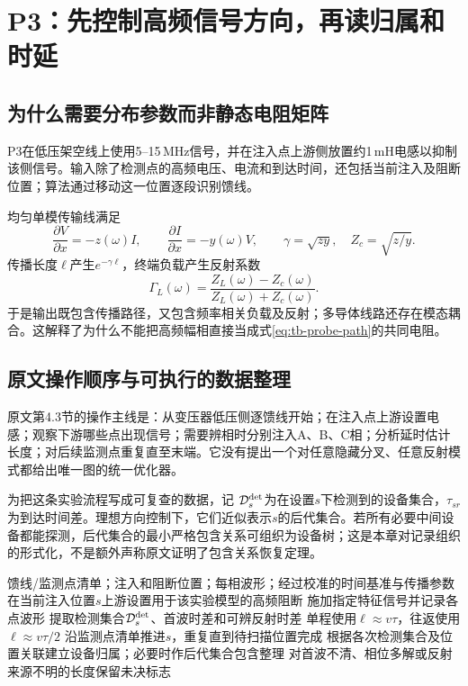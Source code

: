 \documentclass[UTF8,11pt,fontset=fandol,openany,oneside]{ctexbook}
\theoremstyle{definition}
\theoremstyle{remark}
\numberwithin{equation}{chapter}
\begin{document}
\section{P3：先控制高频信号方向，再读归属和时延}
\label{sec:tb-P3}

\subsection{为什么需要分布参数而非静态电阻矩阵}

P3\citep{P3}在低压架空线上使用5--15\,MHz信号，并在注入点上游侧放置约1\,mH电感以抑制该侧信号。输入除了检测点的高频电压、电流和到达时间，还包括当前注入及阻断位置；算法通过移动这一位置逐段识别馈线。

均匀单模传输线满足
\[
 \frac{\partial V}{\partial x}=-z(\omega)I,\qquad
 \frac{\partial I}{\partial x}=-y(\omega)V,\qquad
 \gamma=\sqrt{zy},\quad Z_c=\sqrt{z/y}.
\]
传播长度$\ell$产生$e^{-\gamma\ell}$，终端负载产生反射系数
\begin{equation}
 \Gamma_L(\omega)=\frac{Z_L(\omega)-Z_c(\omega)}
                       {Z_L(\omega)+Z_c(\omega)}.
 \label{eq:tb-P3-reflect}
\end{equation}
于是输出既包含传播路径，又包含频率相关负载及反射；多导体线路还存在模态耦合。这解释了为什么不能把高频幅相直接当成式\eqref{eq:tb-probe-path}的共同电阻。

\subsection{原文操作顺序与可执行的数据整理}

原文第4.3节的操作主线是：从变压器低压侧逐馈线开始；在注入点上游设置电感；观察下游哪些点出现信号；需要辨相时分别注入A、B、C相；分析延时估计长度；对后续监测点重复直至末端。它没有提出一个对任意隐藏分叉、任意反射模式都给出唯一图的统一优化器。

为把这条实验流程写成可复查的数据，记
$\mathcal D_s^{\rm det}$为在设置$s$下检测到的设备集合，$\tau_{sr}$为到达时间差。理想方向控制下，它们近似表示$s$的后代集合。若所有必要中间设备都能探测，后代集合的最小严格包含关系可组织为设备树；这是本章对记录组织的形式化，不是额外声称原文证明了包含关系恢复定理。

\begin{algorithm}[htbp]
\caption{P3的实验扫描主线：原文步骤加教材记录格式}
\label{alg:tb-P3}
\begin{algorithmic}[1]
\Require 馈线/监测点清单；注入和阻断位置；每相波形；经过校准的时间基准与传播参数
 \State 在当前注入位置$s$上游设置用于该实验模型的高频阻断
  \State 施加指定特征信号并记录各点波形
  \State 提取检测集合$\mathcal D_s^{\rm det}$、首波时差和可辨反射时差
  \State 单程使用$\ell\approx v\tau$，往返使用$\ell\approx v\tau/2$
 \EndFor
 \State 沿监测点清单推进$s$，重复直到待扫描位置完成
\EndFor
\State 根据各次检测集合及位置关联建立设备归属；必要时作后代集合包含整理
\State 对首波不清、相位多解或反射来源不明的长度保留未决标志
\end{algorithmic}
\end{algorithm}
\end{document}
